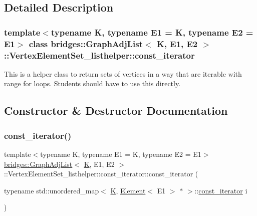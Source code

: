 \subsection{Detailed Description}
\subsubsection*{template$<$typename K, typename E1 = K, typename E2 = E1$>$\newline
class bridges\+::\+Graph\+Adj\+List$<$ K, E1, E2 $>$\+::\+Vertex\+Element\+Set\+\_\+listhelper\+::const\+\_\+iterator}

This is a helper class to return sets of vertices in a way that are iterable with range for loops. Students should have to use this directly. 

\subsection{Constructor \& Destructor Documentation}
\mbox{\label{classbridges_1_1_graph_adj_list_1_1_vertex_element_set__listhelper_1_1const__iterator_a6df7b33e5e32f87ab2c6a9b41939d6ae}} 
\subsubsection{\texorpdfstring{const\+\_\+iterator()}{const\_iterator()}}
{\footnotesize\ttfamily template$<$typename K, typename E1 = K, typename E2 = E1$>$ \\
\hyperlink{classbridges_1_1_graph_adj_list}{bridges\+::\+Graph\+Adj\+List}$<$ \hyperlink{namespacebridges_acfb0a4f7877d8f63de3e6862004c50edaa5f3c6a11b03839d46af9fb43c97c188}{K}, E1, E2 $>$\+::Vertex\+Element\+Set\+\_\+listhelper\+::const\+\_\+iterator\+::const\+\_\+iterator (\begin{DoxyParamCaption}\item[{typename std\+::unordered\+\_\+map$<$ \hyperlink{namespacebridges_acfb0a4f7877d8f63de3e6862004c50edaa5f3c6a11b03839d46af9fb43c97c188}{K}, \hyperlink{classbridges_1_1_element}{Element}$<$ E1 $>$ $\ast$ $>$\+::\hyperlink{classbridges_1_1_graph_adj_list_1_1_vertex_element_set__listhelper_1_1const__iterator}{const\+\_\+iterator}}]{i }\end{DoxyParamCaption})\hspace{0.3cm}{\ttfamily [inline]}}




